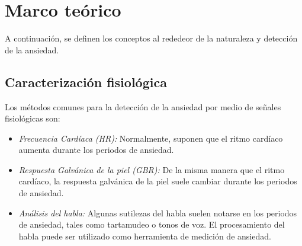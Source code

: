 \documentclass[letterpaper,12pt]{cicese}
\begin{document}
		\chapter{Marco te\'orico} 
			A continuaci\'on, se definen los conceptos al rededeor de la naturaleza y detecci\'on de la ansiedad.
				
			\section{Caracterizaci\'on fisiol\'ogica}
				Los m\'etodos comunes para la detecci\'on de la ansiedad  por medio de se\~nales fisiol\'ogicas son: 
					\begin{itemize}
						\item \emph{Frecuencia Card\'iaca (HR):} Normalmente, suponen que el ritmo card\'iaco aumenta durante los periodos de ansiedad. 
						\item \emph{Respuesta Galv\'anica de la piel (GBR):} De la misma manera que el ritmo card\'iaco, la respuesta galv\'anica de la piel suele cambiar durante los periodos de ansiedad.
						\item \emph{An\'alisis del habla:} Algunas sutilezas del habla suelen notarse en los periodos de ansiedad, tales como tartamudeo o tonos de voz.
						El procesamiento del habla puede  ser utilizado como herramienta de medici\'on de ansiedad.
					\end{itemize}
\end{document}
